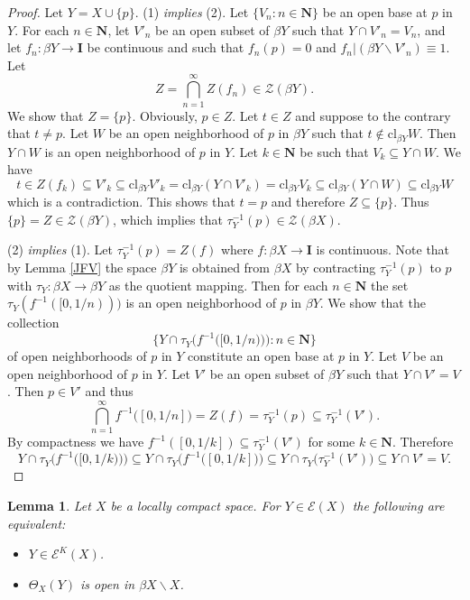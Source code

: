 \documentclass{amsart}
\newtheorem{lemma}[theorem]{Lemma}
\theoremstyle{definition}
\theoremstyle{remark}
\theoremstyle{notation}
\numberwithin{equation}{section}
\begin{document}
\begin{proof}
Let $Y=X\cup\{p\}$. (1) {\em  implies} (2). Let $\{V_n:n\in\mathbf{N}\}$ be an open base at $p$ in $Y$. For each
$n\in \mathbf{N}$, let $V'_n$ be an open subset of $\beta Y$ such that $Y\cap V'_n=V_n$, and let $f_n:\beta Y\rightarrow\mathbf{I}$ be continuous and such that $f_n(p)=0$ and $f_n|(\beta Y\backslash V'_n)\equiv 1$. Let
\[Z=\bigcap_{n=1}^\infty Z(f_n)\in {\mathscr Z}(\beta Y).\]
We show that $Z=\{p\}$. Obviously, $p\in Z$. Let $t\in Z$ and suppose to the contrary that $t\neq p$. Let $W$ be an open neighborhood of $p$ in $\beta Y$ such that $t\notin \mbox{cl}_{\beta Y}W$. Then $Y\cap W$ is an open neighborhood of $p$ in $Y$. Let  $k\in \mathbf{N}$ be such that $V_k\subseteq Y\cap W$. We have
\[t\in Z(f_k)\subseteq V'_k \subseteq\mbox{cl}_{\beta Y}V'_k=\mbox{cl}_{\beta Y}(Y\cap V'_k)=\mbox{cl}_{\beta Y}V_k\subseteq\mbox{cl}_{\beta Y}(Y\cap W)\subseteq\mbox{cl}_{\beta Y}W\]
which is a contradiction. This shows that  $t=p$ and therefore $Z\subseteq \{p\}$. Thus $\{p\}=Z\in {\mathscr Z}(\beta Y)$, which implies that
$\tau^{-1}_Y(p)\in {\mathscr Z}(\beta X)$.

(2) {\em  implies} (1). Let $\tau^{-1}_Y(p)=Z(f)$ where $f:\beta X\rightarrow\mathbf{I}$ is continuous.  Note that by Lemma \ref{JFV} the space $\beta Y$ is obtained from $\beta X$ by contracting $\tau^{-1}_Y(p)$ to $p$ with $\tau_Y:\beta X\rightarrow \beta Y$ as the quotient mapping. Then for each $n\in \mathbf{N}$ the set $\tau_Y(f^{-1}([0,1/n)))$ is an open neighborhood of $p$ in $\beta Y$. We show that the collection
\[\big\{Y\cap\tau_Y\big(f^{-1}\big([0,1/n)\big)\big):n\in \mathbf{N}\big\}\]
of open neighborhoods of $p$ in $Y$ constitute an open base at $p$ in $Y$.  Let $V$ be an open neighborhood of $p$ in $Y$.
Let $V'$ be an open subset of $\beta Y$ such that $Y\cap V'=V$. Then $p\in V'$ and thus
\[\bigcap_{n=1}^\infty f^{-1}\big([0,1/n]\big)=Z(f)=\tau_Y^{-1}(p)\subseteq\tau_Y^{-1}(V').\]
By compactness we have $f^{-1}([0,1/k])\subseteq\tau_Y^{-1}(V')$ for some  $k\in \mathbf{N}$. Therefore
\[Y\cap\tau_Y\big(f^{-1}\big([0,1/k)\big)\big)\subseteq Y\cap\tau_Y\big(f^{-1}\big([0,1/k]\big)\big)\subseteq Y\cap\tau_Y\big(\tau_Y^{-1}(V')\big)\subseteq Y\cap V'=V.\]
\end{proof}

\begin{lemma}\label{FSYH}
Let $X$ be a locally compact  space. For $Y\in{\mathscr E}(X)$ the following are equivalent:
\begin{itemize}
\item[\rm(1)] $Y\in{\mathscr E}^K(X)$.
\item[\rm(2)] $\Theta_X(Y)$ is open in $\beta X\backslash X$.
\end{itemize}
\end{lemma}
\end{document}
